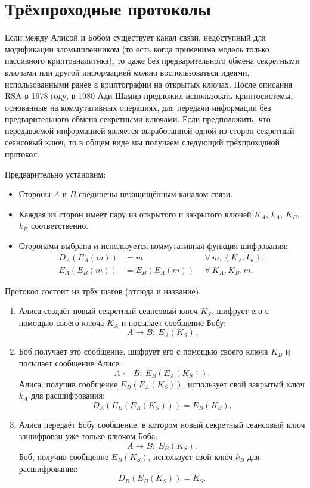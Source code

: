 \section{Трёхпроходные протоколы}

Если между Алисой и Бобом существует канал связи, недоступный для модификации зломышленником (то есть когда применима модель только пассивного криптоаналитика), то даже без предварительного обмена секретными ключами или другой информацией можно воспользоваться идеями, использованными ранее в криптографии на открытых ключах. После описания RSA в 1978 году, в 1980 Ади Шамир предложил использовать криптосистемы, основанные на коммутативных операциях, для передачи информации без предварительного обмена секретными ключами. Если предположить, что передаваемой информацией является выработанной одной из сторон секретный сеансовый ключ, то в общем виде мы получаем следующий трёхпроходной протокол.

Предварительно установим:

\begin{itemize}
	\item Стороны $A$ и $B$ соединены незащищённым каналом связи.
	\item Каждая из сторон имеет пару из открытого и закрытого ключей $K_A$, $k_A$, $K_B$, $k_B$ соответственно.
	\item Сторонами выбрана и используется коммутативная функция шифрования:
	\begin{align*}
		D_{A} \left( E_{A} \left( m \right) \right)	&= m		& ~~\forall ~ m, \left\{ K_A, k_a \right\}; \\
		E_{A} \left( E_{B} \left( m \right) \right)	&= E_B \left( E_A \left( m \right) \right) & ~~\forall ~ K_A, K_B, m.
	\end{align*}
\end{itemize}

Протокол состоит из трёх шагов (отсюда и название).
\begin{enumerate}
    \item Алиса создаёт новый секретный сеансовый ключ $K_S$, шифрует его с помощью своего ключа $K_A$ и посылает сообщение Бобу:
        \[ A \rightarrow B: ~ E_A \left( K_S \right). \]
    \item Боб получает это сообщение, шифрует его с помощью своего ключа $K_B$ и посылает сообщение Алисе:
        \[ A \leftarrow B: ~ E_B \left( E_A \left( K_S \right) \right). \]
    Алиса, получив сообщение $E_B \left( E_A \left( K_S \right) \right)$, использует свой закрытый ключ $k_A$ для расшифрования:
            \[ D_A \left( E_B \left( E_A \left( K_S \right) \right) \right) = E_B \left( K_S \right). \]
    \item Алиса передаёт Бобу сообщение, в котором новый секретный сеансовый ключ зашифрован уже только ключом Боба:
        \[ A \rightarrow B: ~ E_B \left( K_S \right). \]
    Боб, получив сообщение $E_B \left( K_S \right)$, использует свой ключ $k_B$ для расшифрования:
            \[ D_B \left( E_B \left( K_S \right) \right) = K_S. \]
\end{enumerate}

